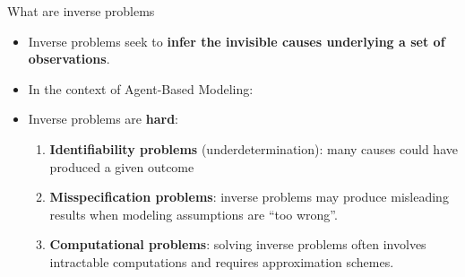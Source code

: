 \documentclass[10pt]{beamer}
\begin{document}
\begin{frame}{What are inverse problems}
    \begin{itemize}
        \item<1-> Inverse problems seek to \textbf{infer the invisible causes underlying a set of observations}.
        \item<2-> In the context of Agent-Based Modeling:
    \end{itemize}


    \begin{itemize}
        \item<4-> Inverse problems are \textbf{hard}:
        \begin{enumerate}
            \item<5-> \textbf{Identifiability problems} (underdetermination): many causes could have produced a given outcome
            \item<6-> \textbf{Misspecification problems}: inverse problems may produce misleading results when modeling assumptions are ``too wrong''.
            \item<7-> \textbf{Computational problems}: solving inverse problems often involves intractable computations and requires approximation schemes.
        \end{enumerate}
    \end{itemize}
\end{frame}
\end{document}
